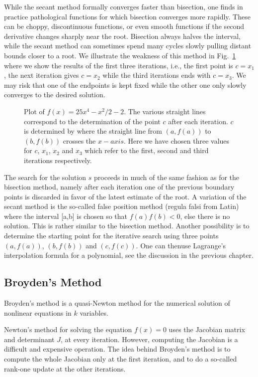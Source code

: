While the secant method formally converges faster than bisection, one
finds in practice pathological functions for which bisection converges more rapidly.
These can be choppy, discontinuous functions, or even smooth functions if the second
derivative changes sharply near the root. Bisection always halves the interval, while
the secant method  can sometimes spend many cycles slowly pulling distant
bounds closer to a root. 
We illustrate the weakness of this method in Fig.\ \ref{fig:chap8fig3}
where we show the results of the first three iterations, i.e.,
the first point is $c=x_1$, the next iteration gives $c=x_2$ while
the third iterations ends with $c=x_3$. We may risk that
one of the endpoints is kept fixed while the other one only slowly converges to  
the desired solution.
\begin{figure}
   
   \caption{Plot of $f(x)=25x^4-x^2/2-2$. The various straight lines correspond
            to the determination of the point $c$ after each iteration.  
            $c$ is determined by where the straight line from $(a,f(a))$ 
            to $(b,f(b))$ crosses the $x-axis$. Here we have chosen three values
            for $c$, $x_1$, $x_2$ and $x_3$ which refer to the first, second and third
            iterations respectively.}
   \label{fig:chap8fig3}
\end{figure}

The search for the solution $s$ proceeds in much of the same fashion as for 
the bisection method, namely
after each iteration one of
the previous boundary points is discarded in favor of the latest estimate of the root.
A variation of the secant method is the so-called false position method
(regula falsi from Latin) where the interval [a,b] is chosen so that
$f(a)f(b) <0$, else there is no solution. This is rather similar 
to the bisection method.
Another possibility is to determine the starting point for the iterative search
using three points $(a,f(a))$, $(b,f(b))$ and $(c,f(c))$. 
One can thenuse Lagrange's 
interpolation formula for a polynomial, see the discussion in the previous chapter.
\subsection{Broyden's Method}
Broyden's method is a quasi-Newton method for the numerical solution of nonlinear equations in $k$ variables. 

Newton's method for solving the equation $f(x) = 0$ uses the Jacobian matrix and determinant $J$, 
at every iteration. However, computing the Jacobian is a difficult and expensive operation. 
The idea behind Broyden's method is to compute the whole Jacobian only at the first iteration, 
and to do a so-called rank-one update at the other iterations.

